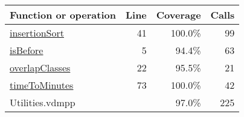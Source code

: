 \bigskip
\begin{longtable}{|l|r|r|r|}
\hline
Function or operation & Line & Coverage & Calls \\
\hline
\hline
\hyperref[insertionSort:41]{insertionSort} & 41&100.0\% & 99 \\
\hline
\hyperref[isBefore:5]{isBefore} & 5&94.4\% & 63 \\
\hline
\hyperref[overlapClasses:22]{overlapClasses} & 22&95.5\% & 21 \\
\hline
\hyperref[timeToMinutes:73]{timeToMinutes} & 73&100.0\% & 42 \\
\hline
\hline
Utilities.vdmpp & & 97.0\% & 225 \\
\hline
\end{longtable}

